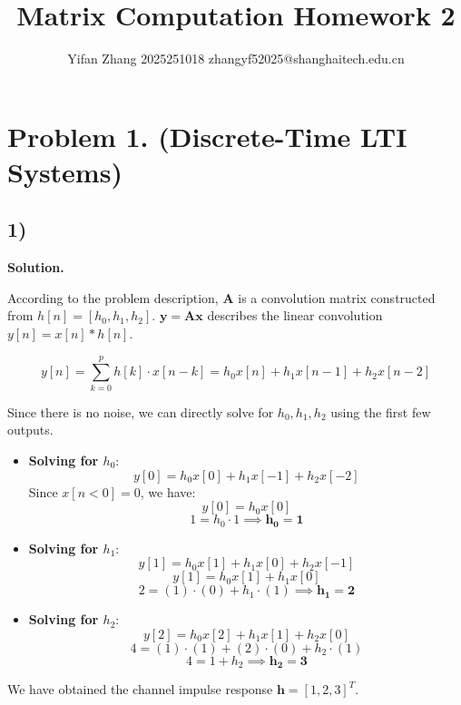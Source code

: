 \documentclass{article}
\title{\Huge Matrix Computation Homework 2}
\author{\normalsize Yifan Zhang  2025251018  zhangyf52025@shanghaitech.edu.cn}
\newcommand{\0}{{\mathbf{0}}} %
\newcommand{\vect}[1]{\mathbf{#1}}
\begin{document}
\maketitle

\section*{Problem 1. (Discrete-Time LTI Systems)}

\subsection*{1)}

\textbf{Solution.}

According to the problem description, $\mathbf{A}$ is a convolution matrix constructed from $h[n] = [h_0, h_1, h_2]$. $\mathbf{y} = \mathbf{A}\mathbf{x}$ describes the linear convolution $y[n] = x[n] * h[n]$.

\[
y[n] = \sum_{k=0}^{p} h[k] \cdot x[n-k] = h_0 x[n] + h_1 x[n-1] + h_2 x[n-2]
\]

Since there is no noise, we can directly solve for $h_0, h_1, h_2$ using the first few outputs.

\begin{itemize}
\item \textbf{Solving for $h_0$}:
  \[
    y[0] = h_0 x[0] + h_1 x[-1] + h_2 x[-2]
  \]
  Since $x[n<0] = 0$, we have:
  \[
    y[0] = h_0 x[0]
  \]
  \[
    1 = h_0 \cdot 1 \implies \mathbf{h_0 = 1}
  \]

\item \textbf{Solving for $h_1$}:
  \[
    y[1] = h_0 x[1] + h_1 x[0] + h_2 x[-1]
  \]
  \[
    y[1] = h_0 x[1] + h_1 x[0]
  \]
  \[
    2 = (1) \cdot (0) + h_1 \cdot (1) \implies \mathbf{h_1 = 2}
  \]

\item \textbf{Solving for $h_2$}:
  \[
    y[2] = h_0 x[2] + h_1 x[1] + h_2 x[0]
  \]
  \[
    4 = (1) \cdot (1) + (2) \cdot (0) + h_2 \cdot (1)
  \]
  \[
    4 = 1 + h_2 \implies \mathbf{h_2 = 3}
  \]
\end{itemize}

We have obtained the channel impulse response $\vect{h} = [1, 2, 3]^T$.
\end{document}
